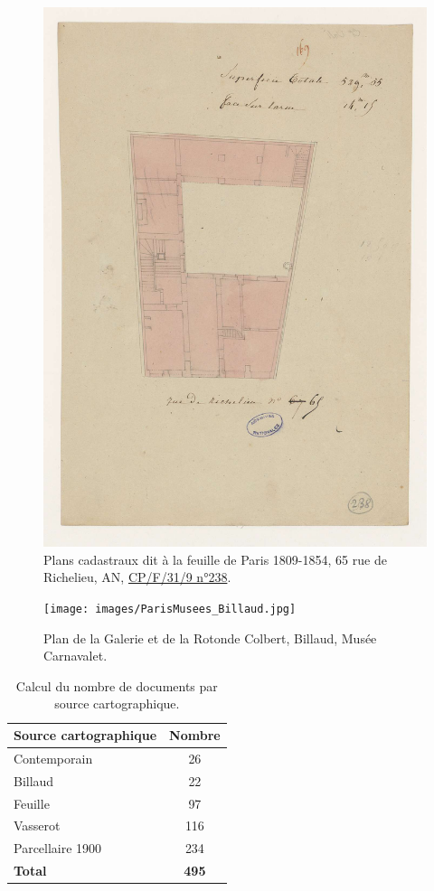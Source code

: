 \begin{figure}[!]
    \centering
    \includegraphics[width=0.5\linewidth]{images/AN_65_Richelieu.jpg}
    \caption{Plans cadastraux dit à la feuille de Paris 1809-1854, 65 rue de Richelieu, AN, \href{https://www.siv.archives-nationales.culture.gouv.fr/siv/media/FRAN_IR_058572/d_2851/FRAN_0198_3023_L}{CP/F/31/9 n°238}.}
    \label{fig:plan_carto_RR65}
\end{figure}

\begin{figure}[!]
    \centering
    \texttt{[image: images/ParisMusees\_Billaud.jpg]}
    \caption{Plan de la Galerie et de la Rotonde Colbert, Billaud, Musée Carnavalet.}
    \label{fig:plan_carto_galeries}
\end{figure}


\begin{table}[!]
\centering
\label{tab:total_carto}
    \begin{tabular}{|l|c|}
    \toprule
    \textbf{Source cartographique} & \textbf{Nombre} \\ 
    \midrule
    Contemporain & 26 \\
    Billaud & 22 \\
    Feuille & 97 \\ 
    Vasserot & 116 \\
    Parcellaire 1900 & 234 \\
    \midrule
    \textbf{Total} & \textbf{495} \\
    \bottomrule
\end{tabular} 
\caption{Calcul du nombre de documents par source cartographique.}
\end{table}


